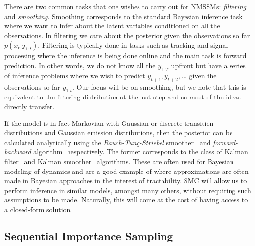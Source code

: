 There are two common tasks that one wishes to carry out for NMSSMs: \emph{filtering} and
\emph{smoothing}.  Smoothing corresponds to the standard Bayesian inference task where we
want to infer about the latent variables conditioned on all the observations.  In filtering
we care about the posterior given the observations
so far $p(x_t | y_{1:t})$.  Filtering is typically done in tasks such as tracking and signal
processing where the inference is being done online and the main task is forward prediction.
In other words, we do not know all the $y_{1:T}$ upfront but have a series of inference problems
where we wish to predict $y_{t+1},y_{t+2},\dots$ given the observations so far $y_{1:t}$.  Our
focus will be on smoothing, but we note that this is equivalent to the filtering distribution
at the last step and so most of the ideas directly transfer.

If the model is in fact Markovian with Gaussian or discrete transition distributions and Gaussian
emission distributions, then the posterior can be calculated analytically using the \emph{Rauch-Tung-Striebel}
smoother~\citep{rauch1965maximum} and \emph{forward-backward} algorithm~\citep{rabiner1986introduction} respectively.
The former corresponds to the class of Kalman filter~\citep{kalman1960new} and Kalman smoother~\citep{rauch1965maximum}
algorithms.  These are often used for Bayesian modeling of dynamics and
are a good example of where approximations are often made in Bayesian approaches in the interest of
tractability.  SMC will allow us to perform inference in similar models, amongst many others, without requiring
such assumptions to be made.  Naturally, this will come at the cost of having access to a closed-form solution.

\subsection{Sequential Importance Sampling}
\label{sec:part:smc:sis}

